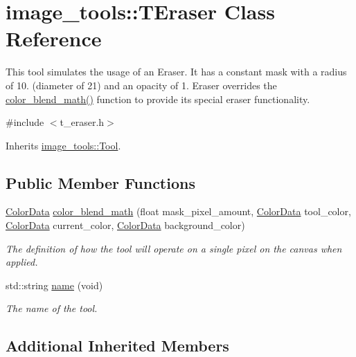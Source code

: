 \hypertarget{classimage__tools_1_1TEraser}{}\section{image\+\_\+tools\+:\+:T\+Eraser Class Reference}
\label{classimage__tools_1_1TEraser}


This tool simulates the usage of an Eraser. It has a constant mask with a radius of 10. (diameter of 21) and an opacity of 1. Eraser overrides the \hyperlink{classimage__tools_1_1TEraser_ace12b9b8fef7740342c41dda069149c0}{color\+\_\+blend\+\_\+math()} function to provide its special eraser functionality.  




{\ttfamily \#include $<$t\+\_\+eraser.\+h$>$}



Inherits \hyperlink{classimage__tools_1_1Tool}{image\+\_\+tools\+::\+Tool}.

\subsection*{Public Member Functions}
\begin{DoxyCompactItemize}
\item 
\hyperlink{classimage__tools_1_1ColorData}{Color\+Data} \hyperlink{classimage__tools_1_1TEraser_ace12b9b8fef7740342c41dda069149c0}{color\+\_\+blend\+\_\+math} (float mask\+\_\+pixel\+\_\+amount, \hyperlink{classimage__tools_1_1ColorData}{Color\+Data} tool\+\_\+color, \hyperlink{classimage__tools_1_1ColorData}{Color\+Data} current\+\_\+color, \hyperlink{classimage__tools_1_1ColorData}{Color\+Data} background\+\_\+color)
\begin{DoxyCompactList}\small\item\em The definition of how the tool will operate on a single pixel on the canvas when applied. \end{DoxyCompactList}\item 
std\+::string \hyperlink{classimage__tools_1_1TEraser_a81b041c9389e310fa446fc9e69d2a82f}{name} (void)
\begin{DoxyCompactList}\small\item\em The name of the tool. \end{DoxyCompactList}\end{DoxyCompactItemize}
\subsection*{Additional Inherited Members}


